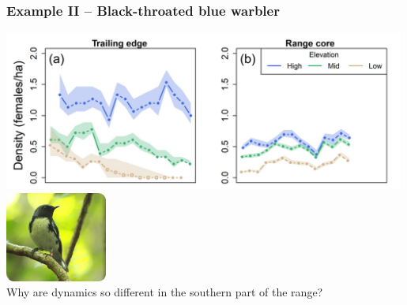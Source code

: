 \documentclass[color=usenames,dvipsnames]{beamer}
\begin{document}
\begin{frame}[fragile]
  \frametitle{Example II -- Black-throated blue warbler}
  {\centering
    \includegraphics[width=0.99\textwidth]{figs/btbw-density-trends} \\
  }
  \vfill
  \centering
    \includegraphics[width=0.25\textwidth]{figs/btbw1} \\
  \pause
  \vfill
  \flushleft
  Why are dynamics so different in the southern part of the range? \\
\end{frame}




\end{document}
